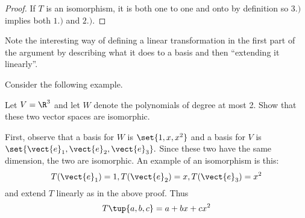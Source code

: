 \begin{proof}
If $T$ is an isomorphism, it is both one to one and onto by definition so $
3.)$ implies both $1.)$ and $2.)$.
\end{proof}

Note the interesting way of defining a linear transformation in the first
part of the argument by describing what it does to a basis and then
``extending it linearly''.

Consider the following example. 

\begin{example}{}{}
Let $V=\R^{3}$ and let $W$ denote the polynomials of degree at most
2. Show that these two vector spaces are isomorphic.
\end{example}

\begin{solution}
First, observe that a basis for $W$ is $\set{1,x,x^{2}} $ and a basis for $V$
is $\set{\vect{e}_{1},\vect{e}_{2},\vect{e}_{3}} .$ Since these two
have the same dimension, the two are
isomorphic. An example of an isomorphism is this:\ 
\begin{equation*}
T(\vect{e}_{1})=1,T(\vect{e}_{2})=x,T(\vect{e}_{3})=x^{2}
\end{equation*}
and extend $T$ linearly as in the above proof. Thus 
\begin{equation*}
T\tup{a,b,c} =a+bx+cx^{2}
\end{equation*}
\end{solution}
